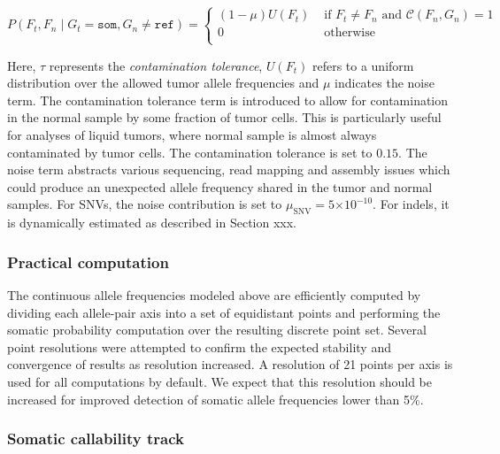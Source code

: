 \documentclass{article}
\newcommand{\e}[1]{\ensuremath{\times 10^{#1}}}
\begin{document}
\begin{equation*}
P(F_t, F_n \mid G_t = \texttt{som}, G_n \neq \texttt{ref})=
\begin{cases}
	(1-\mu)U(F_t) & \text{ if } F_t \neq F_n \text{ and } \mathcal{C}(F_n, G_n) = 1 \\
	0 & \text{ otherwise } \\
\end{cases}
\end{equation*}

\noindent Here, $\tau$ represents the {\em contamination tolerance}, $U(F_t)$ refers to a uniform distribution over the allowed tumor allele frequencies and $\mu$ indicates the noise term. The contamination tolerance term is introduced to allow for contamination in the normal sample by some fraction of tumor cells. This is particularly useful for analyses of liquid tumors, where normal sample is almost always contaminated by tumor cells. The contamination tolerance is set to $0.15$. The noise term abstracts various sequencing, read mapping and assembly issues which could produce an unexpected allele frequency shared in the tumor and normal samples. For SNVs, the noise contribution is set to $\mu_{\text{SNV}} = 5\e{-10}$. For indels, it is dynamically estimated as described in Section xxx.


\subsubsection{Practical computation}

The continuous allele frequencies modeled above are efficiently computed by dividing each allele-pair axis into a set of equidistant points and performing the somatic probability computation over the resulting discrete point set. Several point resolutions were attempted to confirm the expected stability and convergence of results as resolution increased. A resolution of 21 points per axis is used for all computations by default. We expect that this resolution should be increased for improved detection of somatic allele frequencies lower than 5\%.

\subsubsection{Somatic callability track}
\end{document}
